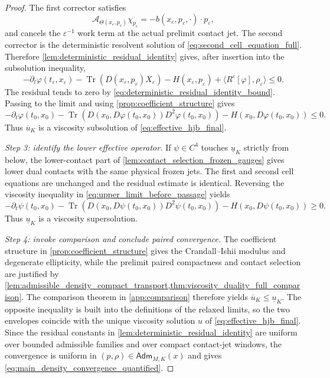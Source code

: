 \documentclass[12pt, letterpaper]{amsart}
\newcommand{\Acal}{\mathcal{A}}
\providecommand{\Tr}{\operatorname{Tr}}
\newcommand{\Adm}{\mathsf{Adm}}
\theoremstyle{plain}
\theoremstyle{definition}
\theoremstyle{remark}
\begin{document}
\begin{proof}
The first corrector satisfies
\begin{equation}
    \Acal_{\Theta(x_\varepsilon,p_\varepsilon)}\chi_{p_\varepsilon}
    =-b(x_\varepsilon,p_\varepsilon,\cdot)\cdot p_\varepsilon,
\end{equation}
and cancels the $\varepsilon^{-1}$ work term at the actual prelimit contact
jet.  The second corrector is the deterministic resolvent solution of
\eqref{eq:second_cell_equation_full}.  Therefore
\cref{lem:deterministic_residual_identity} gives, after insertion into the
subsolution inequality,
\begin{equation}
\label{eq:upper_limit_before_passage}
    -\partial_t\varphi(t_\varepsilon,x_\varepsilon)
    -\Tr(D(x_\varepsilon,p_\varepsilon)X_\varepsilon)
    -H(x_\varepsilon,p_\varepsilon)
    +\langle R^\varepsilon[\varphi],\rho_\varepsilon\rangle\le0.
\end{equation}
The residual tends to zero by
\eqref{eq:deterministic_residual_identity_bound}.  Passing to the limit and using
\cref{prop:coefficient_structure} gives
\begin{equation}
    -\partial_t\varphi(t_0,x_0)
    -\Tr(D(x_0,D\varphi(t_0,x_0))D^2\varphi(t_0,x_0))
    -H(x_0,D\varphi(t_0,x_0))\le0.
\end{equation}
Thus $\overline u_K$ is a viscosity subsolution of
\eqref{eq:effective_hjb_final}.

\emph{Step 3: identify the lower effective operator.}
If $\psi\in C^4$ touches $\underline u_K$ strictly from below, the lower-contact
part of \cref{lem:contact_selection_frozen_gauges} gives lower dual contacts
with the same physical frozen jets.  The first and second cell equations are
unchanged and the residual estimate is identical.  Reversing the viscosity
inequality in \eqref{eq:upper_limit_before_passage} yields
\begin{equation}
    -\partial_t\psi(t_0,x_0)
    -\Tr(D(x_0,D\psi(t_0,x_0))D^2\psi(t_0,x_0))
    -H(x_0,D\psi(t_0,x_0))\ge0.
\end{equation}
Thus $\underline u_K$ is a viscosity supersolution.

\emph{Step 4: invoke comparison and conclude paired convergence.}
The coefficient structure in \cref{prop:coefficient_structure} gives the
Crandall--Ishii modulus and degenerate ellipticity, while the prelimit paired
compactness and contact selection are justified by
\cref{lem:admissible_density_compact_transport,thm:viscosity_duality_full_comparison}.  The comparison theorem in
\cref{app:comparison} therefore yields $\overline u_K\le\underline u_K$.  The
opposite inequality is built into the definitions of the relaxed limits, so the
two envelopes coincide with the unique viscosity solution $u$ of
\eqref{eq:effective_hjb_final}.  Since the residual constants in
\cref{lem:deterministic_residual_identity} are uniform over bounded admissible
families and over compact contact-jet windows, the convergence is uniform in
$(p,\rho)\in\Adm_{M,K}(x)$ and gives
\eqref{eq:main_density_convergence_quantified}.


\end{proof}
\end{document}
